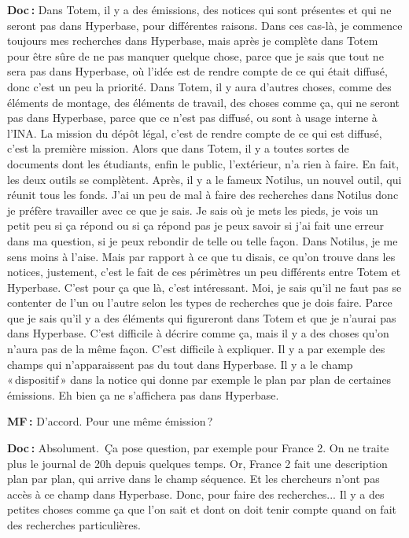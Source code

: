 \textbf{Doc :} Dans Totem, il y a des émissions, des notices qui sont présentes et qui ne seront pas dans Hyperbase, pour différentes raisons.  Dans ces cas-là, je commence toujours mes recherches dans Hyperbase, mais après je complète dans Totem pour être sûre de ne pas manquer quelque chose, parce que je sais que tout ne sera pas dans Hyperbase, où l’idée est de rendre compte de ce qui était diffusé, donc c'est un peu la priorité. Dans Totem, il y aura d’autres choses, comme des éléments de montage, des éléments de travail, des choses comme ça, qui ne seront pas dans Hyperbase, parce que ce n'est pas diffusé, ou sont à usage interne à l’INA.  La mission du dépôt légal, c'est de rendre compte de ce qui est diffusé, c'est la première mission. Alors que dans Totem, il y a toutes sortes de documents dont les étudiants, enfin le public, l'extérieur, n'a rien à faire. En fait, les deux outils se complètent. Après, il y a le fameux Notilus, un nouvel outil, qui réunit tous les fonds. J’ai un peu de mal à faire des recherches dans Notilus donc je préfère travailler avec ce que je sais. Je sais où je mets les pieds, je vois un petit peu si ça répond ou si ça répond pas je peux savoir si j'ai fait une erreur dans ma question, si je peux rebondir de telle ou telle façon. Dans Notilus, je me sens moins à l'aise. Mais par rapport à ce que tu disais, ce qu'on trouve dans les notices, justement, c'est le fait de ces périmètres un peu différents entre Totem et Hyperbase.  C'est pour ça que là, c'est intéressant. Moi, je sais qu'il ne faut pas se contenter de l'un ou l'autre selon les types de recherches que je dois faire.  Parce que je sais qu'il y a des éléments qui figureront dans Totem et que je n'aurai pas dans Hyperbase. C'est difficile à décrire comme ça, mais il y a des choses qu'on n'aura pas de la même façon. C'est difficile à expliquer. Il y a par exemple des champs qui n'apparaissent pas du tout dans Hyperbase. Il y a le champ « dispositif » dans la notice qui donne par exemple le plan par plan de certaines émissions.  Eh bien ça ne s'affichera pas dans Hyperbase. 

\textbf{MF :} D'accord. Pour une même émission ? 

\textbf{Doc :} Absolument. Ça pose question, par exemple pour France 2. On ne traite plus le journal de 20h depuis quelques temps. Or, France 2 fait une description plan par plan, qui arrive dans le champ séquence. Et les chercheurs n'ont pas accès à ce champ dans Hyperbase. Donc, pour faire des recherches... Il y a des petites choses comme ça que l'on sait et dont on doit tenir compte quand on fait des recherches particulières.

